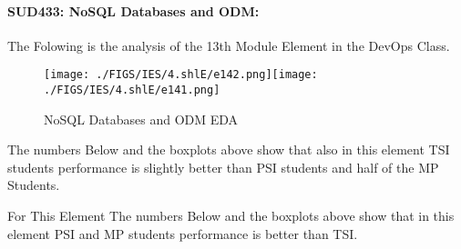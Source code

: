 \documentclass[12pt]{extreport}
\begin{document}

\paragraph{\large SUD433: NoSQL Databases and ODM:\\
}  
The Folowing is the analysis of the 13th Module Element in the DevOps Class.
\begin{figure}[H]
	\centering
	\texttt{[image: ./FIGS/IES/4.shlE/e142.png]}\texttt{[image: ./FIGS/IES/4.shlE/e141.png]}
	\caption{ NoSQL Databases and ODM EDA}
	\label{fig:55}
\end{figure}

The numbers Below and the boxplots above show that also in this element  TSI students performance is slightly better than PSI students and half of the MP Students.

For This Element The numbers Below and the boxplots above show that in this element  PSI and MP students performance is  better than TSI.


\begin{comment}
\subparagraph{Interpretation of the Box-plots:}
For This Element

\begin{enumerate}	
	\item The MP Class Box-Plot:
	\begin{enumerate}
		\item MAX = a {} {} {} {} {} {} {} {} UQ = b {} {} {} {} {} {} {} {} Median = c
		\item LQ = d {} {} {} {} {} {} {} {}  MIN =	l {} {} {} {} {} {} {} {}  IQR = e - f = g
	\end{enumerate}
	\item The PSI Class Box-Plot:
	\begin{enumerate}
		\item MAX = a {} {} {} {} {} {} {} {} UQ = b {} {} {} {} {} {} {} {} Median = c
		\item LQ = d {} {} {} {} {} {} {} {}  MIN =	e {} {} {} {} {} {} {} {} IQR = f - g = h	
	\end{enumerate}
	\item The TSI Class Box-Plot:
	\begin{enumerate}
		\item MAX = a {} {} {} {} {} {} {} {} UQ = b {} {} {} {} {} {} {} {} Median = c
		\item LQ = d {} {} {} {} {} {} {} {} MIN = e {} {} {} {} {} {} {} {} IQR = f - g = h	
	\end{enumerate}
\end{enumerate}


\subparagraph{Interpretation of the histogram:}
This Frequency Distribution is (Skeness) with the following descriptive statistics:
\begin{enumerate}
	\item Mean = 
	\item STD = 
	\item Range = a - b = c
	\item IQR = a-b = c 
\end{enumerate}
\end{comment} 
\end{document}
